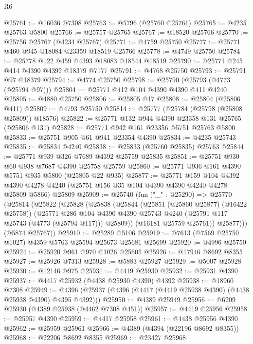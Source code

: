 \begin{lexlean}{R6}
\begin{coremodule}
@25761 := @16036 @7308
@25763 := @5796 (@25760 @25761)
@25765 := @4235 @25763 @5800
@25766 := @25757 @25765
@25767 := @18520 @25766
@25770 := @25756 @25767 (@4234 @25767)
@25771 := @4759 @25750
@25777 := @25771 @460 @945 @18084 @23359 @18519 @25766
@25778 := @4749 @25750
@25784 := @25778 @122 @459 @4393 @18083 @18544 @18519
@25790 := @25771 @245 @414 @4390 @4392 @18379 @7177
@25791 := @4768 @25750
@25793 := @25791 @97 @18379
@25794 := @4774 @25750
@25798 := @25790 (@25793 (@4773 (@25794 @97)))
@25804 := @25771 @412 @104 @4390 @4390 @411 @4240
@25805 := @4880 @25750
@25806 := @25805 @17
@25808 := @25804 (@25806 @411)
@25809 := @4793 @25750
@25814 := @25777 (@25784 (@25798 (@25808 @25809)) @18576)
@25822 := @25771 @132 @944 @4390 @23358 @131 @25765 (@25806 @131)
@25828 := @25771 @942 @161 @23356 @5751 @25763 @5800
@25833 := @25751 @905 @61 @941 @23354 @4390
@25834 := @4235 @25743
@25835 := @25834 @4240
@25838 := @25833 (@25760 @25835) @25763
@25844 := @25771 @939 @326 @7689 @4392 @25759 @25835
@25851 := @25751 @930 @60 @938 @7687 @4390 @25758 @25759
@25860 := @25771 @936 @161 @4390 @5751 @935 @5800 (@25805 @22 @935)
@25877 := @25771
    @159
    @104
    @4392
    @4390
    @4278
    @4240
    (@25751 @156 @35 @104 @4390 @4390 @4240 @4278 @25809 @5866)
    @25809
@25909 := @25740
    (fun ("_" : @25290) =>
    @25770
      (@25814
        (@25822
          (@25828
            (@25838
              (@25844
                (@25851 (@25860 @25877) (@16422 @25758))
                (@25771
                  @286
                  @104
                  @4390
                  @4390
                  @25743
                  @4240
                  (@25791 @117 @25743 (@4773 (@25794 @117)))
                  @25809))
              (@16181 @25759 @25761))
            @25877)))
      (@5874 @25767))
@25910 := @25289 @5106
@25919 := @7613 (@7569 @25750 @1027) @4359 @5763 @25594 @25673 @25681 @25699
@25920 := @4996 @25750
@25924 := @25920 @961 @970 @1026 @25605
@25926 := @17946 @8692 @8355
@25927 := @25926 @7313
@25928 := @5883 @25927
@25929 := @5007 @25928
@25930 := @12146 @975
@25931 := @4419 @25930
@25932 := @25931 @4390
@25937 := @4417 @25932 (@4438 @25930 @4390) @4392
@25938 := @18960 @7308
@25949 := @4396 (@25937 (@4396 (@4417 (@4419 @25938 @4390) (@4438 @25938 @4390) @4395 @4392)))
@25950 := @4389 @25949
@25956 := @6209 @25930 (@4389 @25938 (@4462 @7308 @451))
@25957 := @4419 @25956
@25958 := @25957 @4390
@25959 := @4417 @25958
@25961 := @4438 @25956 @4390
@25962 := @25959 @25961
@25966 := @4389 (@4394 (@22196 @8692 @8355))
@25968 := @22206 @8692 @8355
@25969 := @23427 @25968

\end{coremodule}
\end{lexlean}
